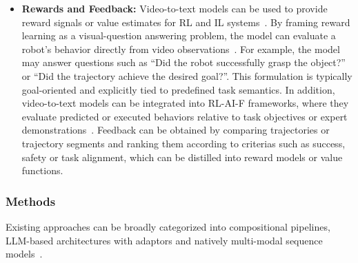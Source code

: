 \begin{itemize}

    \item \textbf{Rewards and Feedback:}
    Video-to-text models can be used to provide reward signals or value estimates for \ac{RL} and \ac{IL} systems~\cite{McCarthy_2025}. By framing reward learning as a visual-question answering problem, the model can evaluate a robot's behavior directly from video observations~\cite{Du2023VisionLanguageMA}. For example, the model may answer questions such as ``Did the robot successfully grasp the object?'' or ``Did the trajectory achieve the desired goal?''. This formulation is typically goal-oriented and explicitly tied to predefined task semantics. 
    In addition, video-to-text models can be integrated into \ac{RL-AI-F} frameworks, where they evaluate predicted or executed behaviors relative to task objectives or expert demonstrations~\cite{Klissarov2023MotifIM}. Feedback can be obtained by comparing trajectories or trajectory segments and ranking them according to criterias such as success, safety or task alignment, which can be distilled into reward models or value functions. 

\end{itemize}



\subsubsection{Methods}
Existing approaches can be broadly categorized into compositional pipelines, \ac{LLM}-based architectures with adaptors and natively multi-modal sequence models~\cite{McCarthy_2025}.

